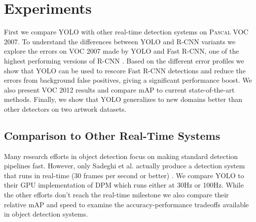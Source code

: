 \documentclass[10pt,twocolumn,letterpaper]{article}
\begin{document}
\section{Experiments}

First we compare YOLO with other real-time detection systems on \textsc{Pascal} VOC 2007. To understand the differences between YOLO and R-CNN variants we explore the errors on VOC 2007 made by YOLO and Fast R-CNN, one of the highest performing versions of R-CNN \cite{DBLP:journals/corr/Girshick15}. Based on the different error profiles we show that YOLO can be used to rescore Fast R-CNN detections and reduce the errors from background false positives, giving a significant performance boost. We also present VOC 2012 results and compare mAP to current state-of-the-art methods. Finally, we show that YOLO generalizes to new domains better than other detectors on two artwork datasets.

\subsection{Comparison to Other Real-Time Systems}

Many research efforts in object detection focus on making standard detection pipelines fast. \cite{dean2013fast} \cite{yan2014fastest} \cite{sadeghi201430hz} \cite{DBLP:journals/corr/Girshick15} \cite{he2014spatial} \cite{ren2015faster} However, only Sadeghi et al. actually produce a detection system that runs in real-time (30 frames per second or better) \cite{sadeghi201430hz}. We compare YOLO to their GPU implementation of DPM which runs either at 30Hz or 100Hz. While the other efforts don't reach the real-time milestone we also compare their relative mAP and speed to examine the accuracy-performance tradeoffs available in object detection systems.
\end{document}
